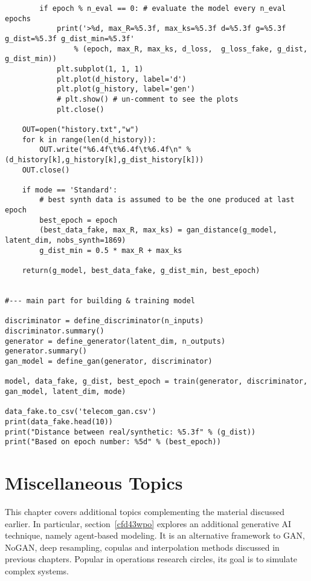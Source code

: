 \documentclass[oneside,10pt]{book}
\begin{document}
\begin{lstlisting}
        if epoch % n_eval == 0: # evaluate the model every n_eval epochs
            print('>%d, max_R=%5.3f, max_ks=%5.3f d=%5.3f g=%5.3f g_dist=%5.3f g_dist_min=%5.3f'
                % (epoch, max_R, max_ks, d_loss,  g_loss_fake, g_dist, g_dist_min))
            plt.subplot(1, 1, 1)
            plt.plot(d_history, label='d')
            plt.plot(g_history, label='gen')
            # plt.show() # un-comment to see the plots
            plt.close()

    OUT=open("history.txt","w")
    for k in range(len(d_history)):
        OUT.write("%6.4f\t%6.4f\t%6.4f\n" %(d_history[k],g_history[k],g_dist_history[k]))
    OUT.close()

    if mode == 'Standard':
        # best synth data is assumed to be the one produced at last epoch
        best_epoch = epoch
        (best_data_fake, max_R, max_ks) = gan_distance(g_model, latent_dim, nobs_synth=1869)
        g_dist_min = 0.5 * max_R + max_ks

    return(g_model, best_data_fake, g_dist_min, best_epoch)


#--- main part for building & training model

discriminator = define_discriminator(n_inputs)
discriminator.summary()
generator = define_generator(latent_dim, n_outputs)
generator.summary()
gan_model = define_gan(generator, discriminator)

model, data_fake, g_dist, best_epoch = train(generator, discriminator, gan_model, latent_dim, mode)

data_fake.to_csv('telecom_gan.csv')
print(data_fake.head(10))
print("Distance between real/synthetic: %5.3f" % (g_dist))
print("Based on epoch number: %5d" % (best_epoch))
\end{lstlisting}




\chapter{Miscellaneous Topics}\label{aasdatk3q}

This chapter covers additional topics complementing the material discussed earlier. In particular, section~\ref{cfd43wpo}
 explores an additional generative AI technique, namely \textcolor{index}{agent-based modeling}.
 It is an alternative framework to GAN, NoGAN, deep resampling, copulas and interpolation methods discussed in previous chapters. Popular
 in operations research circles, its goal is to simulate complex systems.
\end{document}
